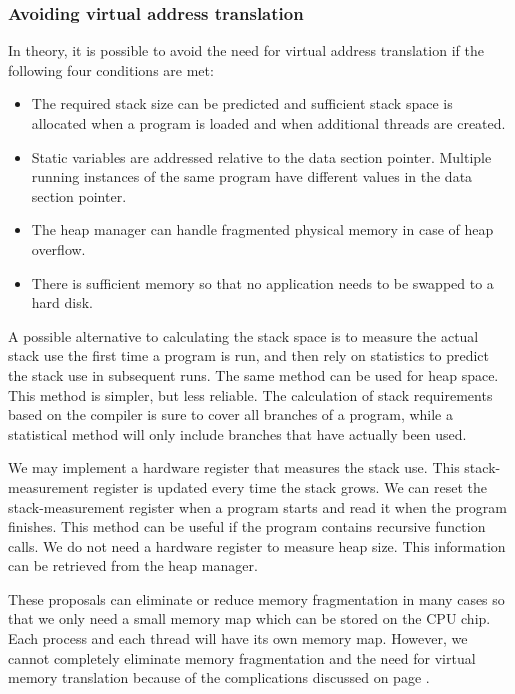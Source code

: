 \documentclass[forwardcom.tex]{subfiles}
\begin{document}
\subsubsection{Avoiding virtual address translation} \label{AvoidingVirtualAddressTranslation}
In theory, it is possible to avoid the need for virtual address translation if the following four conditions are met: 

\begin{itemize}
\item The required stack size can be predicted and sufficient stack space is allocated when a 
program is loaded and when additional threads are created. 

\item Static variables are addressed relative to the data section pointer. Multiple running instances of the same program have different values in the data section pointer. 

\item The heap manager can handle fragmented physical memory in case of heap overflow. 

\item There is sufficient memory so that no application needs to be swapped to a hard disk.
\end{itemize}

A possible alternative to calculating the stack space is to measure the actual stack use the first time a program is run, and then rely on statistics to predict the stack use in subsequent runs. The same method can be used for heap space. This method is simpler, but less reliable. The calculation of stack requirements based on the compiler is sure to cover all branches of a program, while a statistical method will only include branches that have actually been used. 
\vv

We may implement a hardware register that measures the stack use. This stack-measurement register is updated every time the stack grows. We can reset the stack-measurement register when a program starts and read it when the program finishes. This method can be useful if the program contains recursive function calls. 
We do not need a hardware register to measure heap size. This information can be retrieved from the heap manager. 
\vv

These proposals can eliminate or reduce memory fragmentation in many cases so that we only need a small memory map which can be stored on the CPU chip. Each process and each thread will have its own memory map. However, we cannot completely eliminate memory fragmentation and the need for virtual memory translation because of the complications discussed on page \pageref{memoryManagement}.
\end{document}
